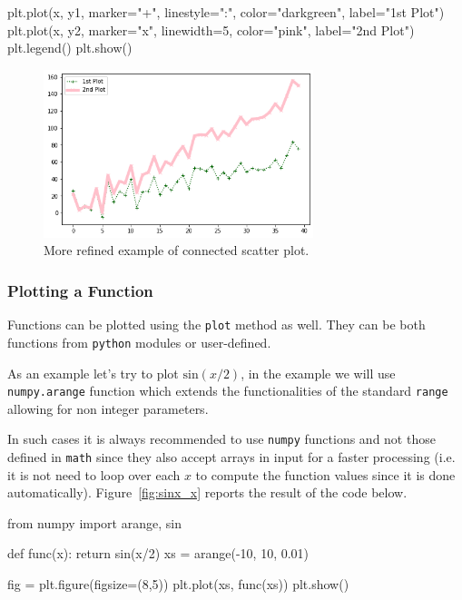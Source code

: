 \begin{ipython}
plt.plot(x, y1, marker="+", linestyle=":", color="darkgreen", label="1st Plot")
plt.plot(x, y2, marker="x", linewidth=5, color="pink", label="2nd Plot")
plt.legend()
plt.show()
\end{ipython}

\begin{figure}[htb]
	\centering
	\includegraphics[width=0.7\textwidth]{figures/plot2}
	\caption{More refined example of connected scatter plot.}
	\label{fig:plot2}
\end{figure}

\subsubsection{Plotting a Function}\label{plotting-a-function}

Functions can be plotted using the \texttt{plot} method as well. They can be both functions from \texttt{python} modules or user-defined.

As an example let's try to plot \(\mathrm{sin}(x/2)\), in the example we will use \texttt{numpy.arange} function which extends the functionalities of the standard \texttt{range} allowing for non integer parameters.

In such cases it is always recommended to use \texttt{numpy} functions and not those defined in \texttt{math} since they also accept arrays in input for a faster processing (i.e. it is not need to loop over each \(x\) to compute the function values since it is done automatically).
Figure~\ref{fig:sinx_x} reports the result of the code below.

\begin{ipython}
from numpy import arange, sin

def func(x):
    return sin(x/2)
xs = arange(-10, 10, 0.01)

fig = plt.figure(figsize=(8,5))
plt.plot(xs, func(xs))
plt.show()
\end{ipython}

